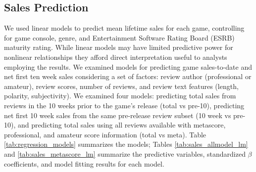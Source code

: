 \documentclass[letterpaper]{article}
\begin{document}
\subsection{Sales Prediction}
We used linear models to predict mean lifetime sales for each game, controlling for game console, genre, and Entertainment Software Rating Board (ESRB) maturity rating. While linear models may have limited predictive power for nonlinear relationships they afford direct interpretation useful to analysts employing the results. We examined models for predicting game sales-to-date and net first ten week sales considering a set of factors: review author (professional or amateur), review scores, number of reviews, and review text features (length, polarity, subjectivity). We examined four models: predicting total sales from reviews in the 10 weeks prior to the game's release (total vs pre-10), predicting net first 10 week sales from the same pre-release review subset (10 week vs pre-10), and predicting total sales using all reviews available with metascore, professional, and amateur score information (total vs meta). Table \ref{tab:regression_models} summarizes the models; Tables \ref{tab:sales_allmodel_lm} and \ref{tab:sales_metascore_lm} summarize the predictive variables, standardized $\beta$ coefficients, and model fitting results for each model.
\end{document}

